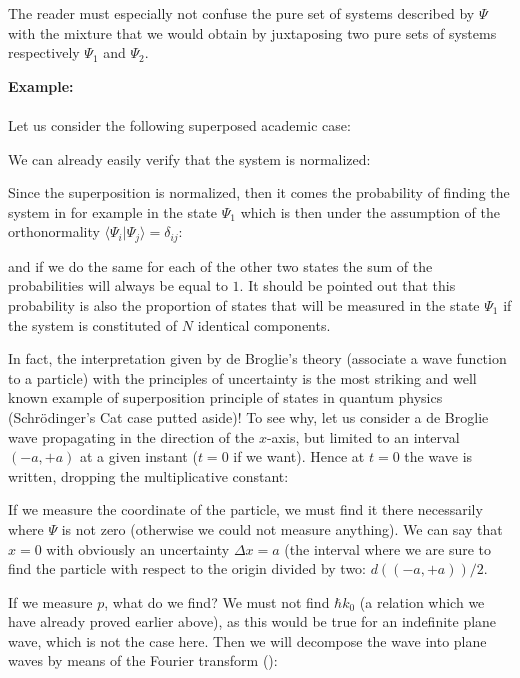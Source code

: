 	\begin{tcolorbox}[title=Remark,colframe=black,arc=10pt]
	The reader must especially not confuse the pure set of systems described by $\Psi$ with the mixture that we would obtain by juxtaposing two pure sets of systems respectively $\Psi_1$ and $\Psi_2$.
	\end{tcolorbox}
	
	\begin{tcolorbox}[colframe=black,colback=white,sharp corners]
	\textbf{{\Large {}}Example:}\\\\
	Let us consider the following superposed academic case:
	
	We can already easily verify that the system is normalized:
	
	Since the superposition is normalized, then it comes the probability of finding the system in for example in the state $\Psi_1$ which is then under the assumption of the orthonormality $\langle \Psi_i|\Psi_j \rangle=\delta_{ij}$:
	
	and if we do the same for each of the other two states the sum of the probabilities will always be equal to $1$. It should be pointed out that this probability is also the proportion of states that will be measured in the state $\Psi_1$ if the system is constituted of $N$ identical components.
	\end{tcolorbox}
	In fact, the interpretation given by de Broglie's theory (associate a wave function to a particle) with the principles of uncertainty is the most striking and well known example of superposition principle of states in quantum physics (Schrödinger's Cat case putted aside)! To see why, let us consider a de Broglie wave propagating in the direction of the $x$-axis, but limited to an interval $(-a,+a)$ at a given instant ($t=0$ if we want). Hence at $t=0$ the wave is written, dropping the multiplicative constant:
	
	If we measure the coordinate of the particle, we must find it there necessarily where $\Psi$ is not zero (otherwise we could not measure anything). We can say that $x=0$ with obviously an uncertainty $\Delta x=a$ (the interval where we are sure to find the particle with respect to the origin divided by two: $d((-a,+a))/2$.
	
	If we measure $p$, what do we find? We must not find $\hbar k_0$ (a relation which we have already proved earlier above), as this would be true for an indefinite plane wave, which is not the case here. Then we will decompose the wave into plane waves by means of the Fourier transform ():
	
